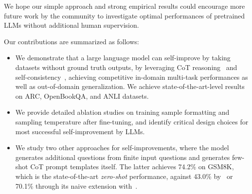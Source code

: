 We hope our simple approach and strong empirical results could encourage more future work by the community to investigate optimal performances of pretrained LLMs without additional human supervision.

Our contributions are summarized as follows:
\begin{itemize}
    \item We demonstrate that a large language model can self-improve by taking datasets without ground truth outputs, by leveraging CoT reasoning~\citep{Wei2022ChainOT} and self-consistency~\citep{Wang2022SelfConsistencyIC}, achieving competitive in-domain multi-task performances as well as out-of-domain generalization. We achieve state-of-the-art-level results on ARC, OpenBookQA, and ANLI datasets.
    \item We provide detailed ablation studies on training sample formatting and sampling temperature after fine-tuning, and identify critical design choices for most successful self-improvement by LLMs.
    \item We study two other approaches for self-improvements, where the model generates additional questions from finite input questions and generates few-shot CoT prompt templates itself. The latter achieves 74.2\% on GSM8K, which is the state-of-the-art \textit{zero-shot} performance, against 43.0\% by~\citet{step_by_step} or 70.1\% through its naive extension with~\citet{Wang2022SelfConsistencyIC}. 
\end{itemize}

